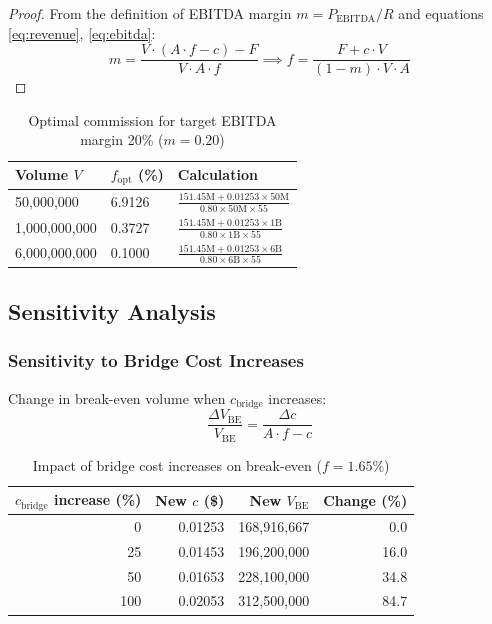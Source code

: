 \documentclass[12pt,a4paper]{article}
\theoremstyle{definition}
\theoremstyle{remark}
\newcommand{\USD}[1]{\$#1}
\DeclareMathOperator{\EBITDA}{EBITDA}
\begin{document}
\begin{proof}
From the definition of EBITDA margin $m = P_{\EBITDA} / R$ and equations \eqref{eq:revenue}, \eqref{eq:ebitda}:
\begin{equation}
m = \frac{V \cdot (A \cdot f - c) - F}{V \cdot A \cdot f} \implies f = \frac{F + c \cdot V}{(1 - m) \cdot V \cdot A}
\end{equation}
\end{proof}

\begin{table}[H]
\centering
\caption{Optimal commission for target EBITDA margin 20\% ($m = 0.20$)}
\label{tab:optimal-commission}
\begin{tabular}{R{3cm}R{2.5cm}L{6cm}}
\toprule
\textbf{Volume $V$} & \textbf{$f_{\text{opt}}$ (\%)} & \textbf{Calculation} \\
000{,}000 & 6.9126 & $\frac{151.45\text{M} + 0.01253 \times 50\text{M}}{0.80 \times 50\text{M} \times 55}$ \\[6pt]
1{,}000{,}000{,}000 & 0.3727 & $\frac{151.45\text{M} + 0.01253 \times 1\text{B}}{0.80 \times 1\text{B} \times 55}$ \\[6pt]
6{,}000{,}000{,}000 & 0.1000 & $\frac{151.45\text{M} + 0.01253 \times 6\text{B}}{0.80 \times 6\text{B} \times 55}$ \\
\bottomrule
\end{tabular}
\end{table}

\subsection{Sensitivity Analysis}

\subsubsection{Sensitivity to Bridge Cost Increases}

Change in break-even volume when $c_{\text{bridge}}$ increases:
\begin{equation}
\frac{\Delta V_{\text{BE}}}{V_{\text{BE}}} = \frac{\Delta c}{A \cdot f - c}
\end{equation}

\begin{table}[H]
\centering
\caption{Impact of bridge cost increases on break-even ($f = 1.65\%$)}
\label{tab:bridge-sensitivity}
\begin{tabular}{rrrr}
\toprule
\textbf{$c_{\text{bridge}}$ increase (\%)} & \textbf{New $c$ (\USD{})} & \textbf{New $V_{\text{BE}}$} & \textbf{Change (\%)} \\
\midrule
0 & 0.01253 & 168{,}916{,}667 & 0.0 \\
25 & 0.01453 & 196{,}200{,}000 & 16.0 \\
50 & 0.01653 & 228{,}100{,}000 & 34.8 \\
100 & 0.02053 & 312{,}500{,}000 & 84.7 \\
\bottomrule
\end{tabular}
\end{table}
\end{document}
